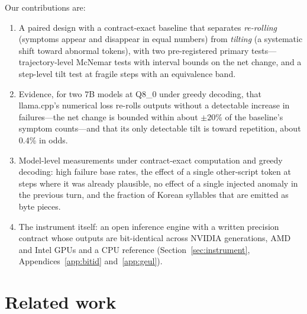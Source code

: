 \documentclass[11pt]{article}
\begin{document}
Our contributions are:
\begin{enumerate}
\item A paired design with a contract-exact baseline that separates \emph{re-rolling} (symptoms appear and disappear in
      equal numbers) from \emph{tilting} (a systematic shift toward abnormal tokens), with two pre-registered primary
      tests---trajectory-level McNemar tests with interval bounds on the net change, and a step-level tilt test at fragile
      steps with an equivalence band.
\item Evidence, for two 7B models at Q8\_0 under greedy decoding, that llama.cpp's numerical loss re-rolls outputs without a
      detectable increase in failures---the net change is bounded within about $\pm20$\% of the baseline's symptom
      counts---and that its only detectable tilt is toward repetition, about 0.4\% in odds.
\item Model-level measurements under contract-exact computation and greedy decoding: high failure base rates, the effect of
      a single other-script token at steps where it was already plausible, no effect of a single injected anomaly in the
      previous turn, and the fraction of Korean syllables that are emitted as byte pieces.
\item The instrument itself: an open inference engine with a written precision contract whose outputs are bit-identical
      across NVIDIA generations, AMD and Intel GPUs and a CPU reference (Section~\ref{sec:instrument},
      Appendices~\ref{app:bitid} and~\ref{app:geul}).
\end{enumerate}

\section{Related work}\label{sec:related}
\end{document}

